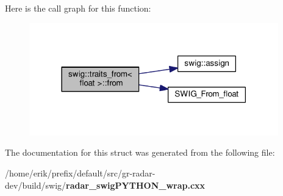 Here is the call graph for this function\+:
\nopagebreak
\begin{figure}[H]
\begin{center}
\leavevmode
\includegraphics[width=306pt]{d0/d69/structswig_1_1traits__from_3_01float_01_4_aa2ddc004c2b5fa9dbc19da5ddf6999bc_cgraph}
\end{center}
\end{figure}




The documentation for this struct was generated from the following file\+:\begin{DoxyCompactItemize}
\item 
/home/erik/prefix/default/src/gr-\/radar-\/dev/build/swig/{\bf radar\+\_\+swig\+P\+Y\+T\+H\+O\+N\+\_\+wrap.\+cxx}\end{DoxyCompactItemize}
